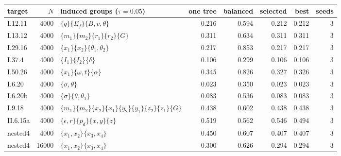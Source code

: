 \begin{tabular}{@{}lrlrrrrr@{}}\toprule
target & $N$ & induced groups ($\tau=0.05$) & one tree & balanced & selected & best & seeds\\\midrule
I.12.11 & 4000 & $\{q\} \{E_f\} \{B,v,\theta\}$ & 0.216 & 0.594 & 0.212 & 0.212 & 3\\
I.13.12 & 4000 & $\{m_1\} \{m_2\} \{r_1\} \{r_2\} \{G\}$ & 0.311 & 0.634 & 0.311 & 0.311 & 3\\
I.29.16 & 4000 & $\{x_1\} \{x_2\} \{\theta_1,\theta_2\}$ & 0.217 & 0.853 & 0.217 & 0.217 & 3\\
I.37.4 & 4000 & $\{I_1\} \{I_2\} \{\delta\}$ & 0.106 & 0.299 & 0.106 & 0.106 & 3\\
I.50.26 & 4000 & $\{x_1\} \{\omega,t\} \{\alpha\}$ & 0.345 & 0.826 & 0.327 & 0.326 & 3\\
I.6.20 & 4000 & $\{\sigma,\theta\}$ & 0.023 & 0.350 & 0.023 & 0.023 & 3\\
I.6.20b & 4000 & $\{\sigma\} \{\theta,\theta_1\}$ & 0.083 & 0.536 & 0.083 & 0.083 & 3\\
I.9.18 & 4000 & $\{m_1\} \{m_2\} \{x_2\} \{x_1\} \{y_2\} \{y_1\} \{z_2\} \{z_1\} \{G\}$ & 0.438 & 0.602 & 0.438 & 0.438 & 3\\
II.6.15a & 4000 & $\{\epsilon,r\} \{p_d\} \{x,y\} \{z\}$ & 0.519 & 0.562 & 0.546 & 0.494 & 3\\
nested4 & 4000 & $\{x_1,x_2\} \{x_3,x_4\}$ & 0.450 & 0.607 & 0.407 & 0.407 & 3\\
nested4 & 16000 & $\{x_1,x_2\} \{x_3,x_4\}$ & 0.300 & 0.626 & 0.294 & 0.294 & 3\\
\bottomrule\end{tabular}